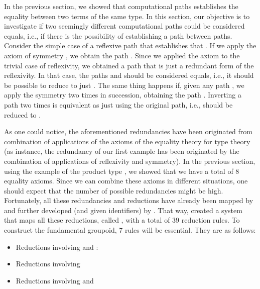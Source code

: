\documentclass[12pt, a4paper,  oneside, headinclude,footinclude, BCOR5mm]{scrartcl}
\begin{document}
In the previous section, we showed that computational paths establishes the equality between two terms of the same type. In this section, our objective is to investigate if two seemingly different computational paths could be considered equals, i.e., if there is the possibility of establishing a path between paths. Consider the simple case of a reflexive path  that establishes that . If we apply the axiom of symmetry , we obtain the path . Since we applied the axiom  to the trivial case of reflexivity, we obtained a path that is just a redundant form of the reflexivity. In that case, the paths  and  should be considered equals, i.e., it should be possible to reduce  to just . The same thing happens if, given any path , we apply the symmetry two times in succession, obtaining the path . Inverting a path two times is equivalent as just using the original path, i.e.,  should be reduced to .

As one could notice, the aforementioned redundancies have been originated from combination of applications of the axioms of the equality theory for type theory (as instance, the redundancy of our first example has been originated by the combination of applications of reflexivity and symmetry). In the previous section, using the example of the product type , we showed that we have a total of 8 equality axioms. Since we can combine these axioms in different situations, one should expect that the number of possible redundancies might be high. Fortunately, all these redundancies and reductions have already been mapped by \cite{Anjo1} and further developed (and given identifiers) by \cite{Ruy1}. That way, \cite{Anjo1} created a system that maps all these reductions, called , with a total of 39 reduction rules. To construct the fundamental groupoid, 7 rules will be essential. They are as follows:

\begin{itemize}

\item Reductions involving  and :

 \quad 

\item Reductions involving 

 \quad 

 \quad 

\item Reductions involving  and 



\end{itemize}
\end{document}

